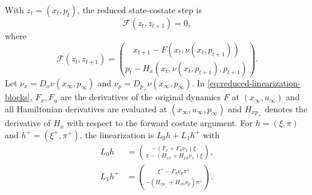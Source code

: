 \documentclass[twocolumn,nameyear,amsthm]{autart}
\newcommand{\Fbar}{F}
\newcommand{\xinf}{x_\infty}
\newcommand{\uinf}{u_\infty}
\newcommand{\pinf}{p_\infty}
\numberwithin{equation}{section}
\begin{document}
With $z_t=(x_t,p_t)$, the reduced state-costate step is
\begin{equation}\label{eq:reduced}
      \mathcal F(z_t,z_{t+1})=0,
\end{equation}
where
\begin{equation}\label{eq:Fdef}
\mathcal F(z_t,z_{t+1})=
\binom{x_{t+1}-\Fbar(x_t,\nu(x_t,p_{t+1}))}
      {p_t-H_x(x_t,\nu(x_t,p_{t+1}),p_{t+1})}.
\end{equation}
Let $\nu_x=D_x\nu(\xinf,\pinf)$ and $\nu_p=D_{p_+}\nu(\xinf,\pinf)$.  In \eqref{eq:reduced-linearization-blocks}, $\Fbar_x,\Fbar_u$ are the derivatives of the original dynamics $\Fbar$ at $(\xinf,\uinf)$ and all Hamiltonian derivatives are evaluated at $(\xinf,\uinf,\pinf)$ and $H_{x p_+}$ denotes the derivative of $H_x$ with respect to the forward costate argument.  For $h=(\xi,\pi)$ and $h^+=(\xi^+,\pi^+)$, the linearization is $L_0h+L_1h^+$ with
\begin{equation}\label{eq:reduced-linearization-blocks}
\begin{aligned}
L_0h&=
\binom{-(\Fbar_x+\Fbar_u\nu_x)\xi}
      {\pi-(H_{xx}+H_{xu}\nu_x)\xi},\\
L_1h^+&=
\binom{\xi^+-\Fbar_u\nu_p\pi^+}
      {-(H_{x p_+}+H_{xu}\nu_p)\pi^+}.
\end{aligned}
\end{equation}
\end{document}
